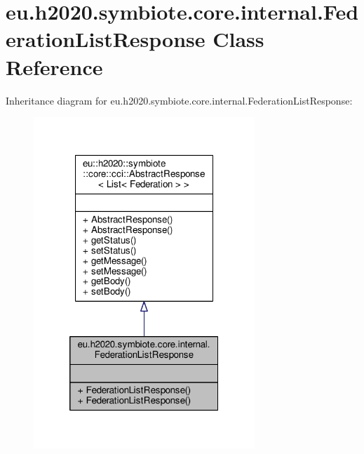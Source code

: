 \hypertarget{classeu_1_1h2020_1_1symbiote_1_1core_1_1internal_1_1FederationListResponse}{}\section{eu.\+h2020.\+symbiote.\+core.\+internal.\+Federation\+List\+Response Class Reference}
\label{classeu_1_1h2020_1_1symbiote_1_1core_1_1internal_1_1FederationListResponse}


Inheritance diagram for eu.\+h2020.\+symbiote.\+core.\+internal.\+Federation\+List\+Response\+:
\nopagebreak
\begin{figure}[H]
\begin{center}
\leavevmode
\includegraphics[width=236pt]{classeu_1_1h2020_1_1symbiote_1_1core_1_1internal_1_1FederationListResponse__inherit__graph}
\end{center}
\end{figure}


